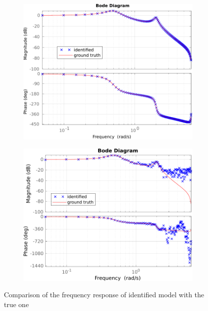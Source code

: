\documentclass{scrartcl}
\newcommand*{\matlabcode}[3]{\begin{figure}[h!]\end{figure}}
\begin{document}
\begin{figure}[h]
	\begin{subfigure}{0.45\textwidth}
		\includegraphics[width=\textwidth]{figures/resp_nonoise.pdf}
		\label{fig:resp_noiseless}
	\end{subfigure}
	\hspace*{0.05\textwidth}
	\begin{subfigure}{0.45\textwidth}
		\includegraphics[width=\textwidth]{figures/resp_noise.pdf}
		\label{fig:resp_noise}
	\end{subfigure}
	\caption{Comparison of the frequency response of identified model with the true one}\label{fig:f_resp}
\end{figure}
\matlabcode{../matlab/ce1/estimate_frequency_response.m}
{{Compute the frequency response of the system to be identified using an average of Fourier transforms of each period. The first period is skipped as we wait for transience to vanish. Additionally, the frequency vector is computed.}}
{lst:freq_resp}
\end{document}
